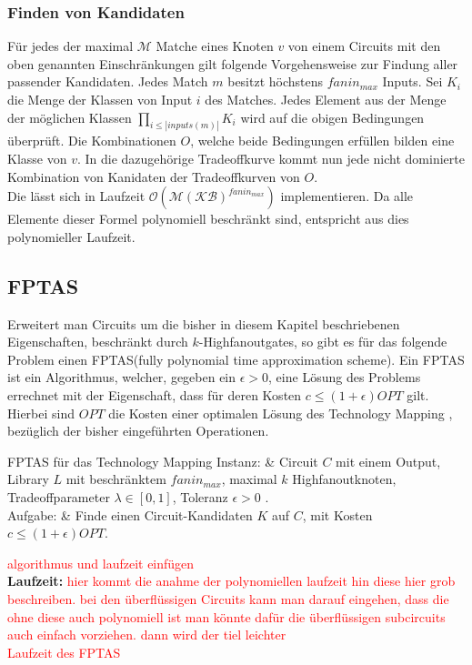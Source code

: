 \documentclass[11pt, a4paper, german]{article}
\newcommand{\TM}{Technology  Mapping }
\begin{document}
\subsubsection{Finden von Kandidaten} 
Für jedes der maximal $\mathcal{M}$ Matche eines Knoten $v$ von einem Circuits mit den oben genannten Einschränkungen gilt folgende Vorgehensweise zur Findung aller passender Kandidaten. Jedes Match $m$ besitzt höchstens $fanin_{max}$ Inputs. Sei $K_i$ die Menge der Klassen von Input $i$ des Matches. Jedes Element aus der Menge der möglichen Klassen $\prod_{i\leq |inputs(m)|} K_i $ wird auf die obigen Bedingungen überprüft. Die Kombinationen $O$, welche beide Bedingungen erfüllen bilden eine Klasse von $v$. In die  dazugehörige Tradeoffkurve kommt nun jede nicht dominierte Kombination von Kanidaten der Tradeoffkurven von $O$. \\
Die lässt sich in Laufzeit $\mathcal{O}(\mathcal{M}(\mathcal{KB})^{fanin_{max}} )$ implementieren. Da alle Elemente dieser Formel polynomiell beschränkt sind, entspricht aus dies polynomieller Laufzeit.
 
\subsection{FPTAS}
\label{subsec:fptas}
Erweitert man Circuits um die bisher in diesem Kapitel beschriebenen Eigenschaften, beschränkt durch $k$-Highfanoutgates, so gibt es für das folgende Problem einen FPTAS(fully polynomial time approximation scheme). Ein FPTAS ist ein Algorithmus, welcher, gegeben ein $\epsilon > 0$, eine Lösung des Problems errechnet mit der Eigenschaft, dass für deren Kosten $c \leq (1+\epsilon)OPT$ gilt. Hierbei sind $OPT$ die Kosten einer optimalen Lösung des \TM , bezüglich der bisher eingeführten Operationen.\\
 \begin{problem}[framed]{FPTAS für das \TM}
  Instanz:  & Circuit $C$ mit einem Output, Library $L$ mit beschr\"anktem $fanin_{max}$, maximal $k$ Highfanoutknoten, Tradeoffparameter $\lambda \in [0,1]$, Toleranz $\epsilon > 0$ .\\
  Aufgabe: &  Finde einen Circuit-Kandidaten $K$ auf $C$, mit Kosten $c \leq (1+\epsilon)OPT$.
\end{problem}
\textcolor{red}{algorithmus und laufzeit einfügen}\\
{\bf Laufzeit: }
\textcolor{red}{hier kommt die anahme der polynomiellen laufzeit hin diese hier grob beschreiben. bei den überflüssigen Circuits kann man darauf eingehen, dass die ohne diese auch polynomiell ist man könnte dafür die überflüssigen subcircuits auch einfach vorziehen. dann wird der tiel leichter}\\
\textcolor{red}{Laufzeit des FPTAS}
\end{document}
